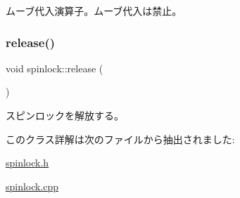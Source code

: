 ムーブ代入演算子。ムーブ代入は禁止。 \hypertarget{classspinlock_af1f2e2a0713952b445c8a0754e318c6e}{}\label{classspinlock_af1f2e2a0713952b445c8a0754e318c6e} 
\subsubsection{\texorpdfstring{release()}{release()}}
{\footnotesize\ttfamily void spinlock\+::release (\begin{DoxyParamCaption}{ }\end{DoxyParamCaption})}

スピンロックを解放する。 

このクラス詳解は次のファイルから抽出されました\+:\begin{DoxyCompactItemize}
\item 
\hyperlink{spinlock_8h}{spinlock.\+h}\item 
\hyperlink{spinlock_8cpp}{spinlock.\+cpp}\end{DoxyCompactItemize}

